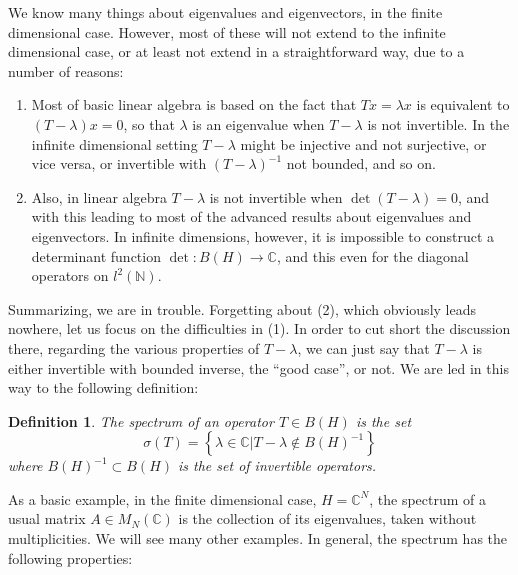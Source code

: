 \documentclass[12pt]{amsbook}
\newtheorem{definition}[theorem]{Definition}
\begin{document}
We know many things about eigenvalues and eigenvectors, in the finite dimensional case. However, most of these will not extend to the infinite dimensional case, or at least not extend in a straightforward way, due to a number of reasons:

\medskip

\begin{enumerate}
\item Most of basic linear algebra is based on the fact that $Tx=\lambda x$ is equivalent to $(T-\lambda)x=0$, so that $\lambda$ is an eigenvalue when $T-\lambda$ is not invertible. In the infinite dimensional setting $T-\lambda$ might be injective and not surjective, or vice versa, or invertible with $(T-\lambda)^{-1}$ not bounded, and so on.

\medskip

\item Also, in linear algebra $T-\lambda$ is not invertible when $\det(T-\lambda)=0$, and with this leading to most of the advanced results about eigenvalues and eigenvectors. In infinite dimensions, however, it is impossible to construct a determinant function $\det:B(H)\to\mathbb C$, and this even for the diagonal operators on $l^2(\mathbb N)$.
\end{enumerate}

\medskip

Summarizing, we are in trouble. Forgetting about (2), which obviously leads nowhere, let us focus on the difficulties in (1). In order to cut short the discussion there, regarding the various properties of $T-\lambda$, we can just say that $T-\lambda$ is either invertible with bounded inverse, the ``good case'', or not. We are led in this way to the following definition:


\begin{definition}
The spectrum of an operator $T\in B(H)$ is the set
$$\sigma(T)=\left\{\lambda\in\mathbb C\Big|T-\lambda\not\in B(H)^{-1}\right\}$$
where $B(H)^{-1}\subset B(H)$ is the set of invertible operators.
\end{definition}

As a basic example, in the finite dimensional case, $H=\mathbb C^N$, the spectrum of a usual matrix $A\in M_N(\mathbb C)$ is the collection of its eigenvalues, taken without multiplicities. We will see many other examples. In general, the spectrum has the following properties:

\end{document}
